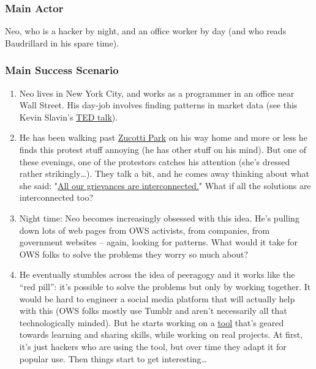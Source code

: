 \subsubsection{Main Actor}

Neo, who is a hacker by night, and an office worker by day (and who
reads Baudrillard in his spare time).

\subsubsection{Main Success Scenario}

\begin{enumerate}
\item
  Neo lives in New York City, and works as a programmer in an office
  near Wall Street. His day-job involves finding patterns in market data
  (see this Kevin Slavin's
  \href{http://www.ted.com/talks/kevin\_slavin\_how\_algorithms\_shape\_our\_world.html}{TED
  talk}).
\item
  He has been walking past
  \href{http://en.wikipedia.org/wiki/Zuccotti\_Park}{Zucotti Park} on
  his way home and more or less he finds this protest stuff annoying (he
  has other stuff on his mind). But one of these evenings, one of the
  protestors catches his attention (she's dressed rather
  strikingly\ldots{}). They talk a bit, and he comes away thinking about
  what she said:
  "\href{http://www.nycga.net/files/2011/11/DeclarationFlowchart\_v2\_large.jpg}{All
  our grievances are interconnected.}" What if all the solutions are
  interconnected too?
\item
  Night time: Neo becomes increasingly obsessed with this idea. He's
  pulling down lots of web pages from OWS activists, from companies,
  from government websites -- again, looking for patterns. What would it
  take for OWS folks to solve the problems they worry so much about?
\item
  He eventually stumbles across the idea of peeragogy and it works like
  the ``red pill'': it's possible to solve the problems but only by
  working together. It would be hard to engineer a social media platform
  that will actually help with this (OWS folks mostly use Tumblr and
  aren't necessarily all that technologically minded). But he starts
  working on a
  \href{http://campus.ftacademy.org/wiki/index.php/Free\_Technology\_Guild}{tool}
  that's geared towards learning and sharing skills, while working on
  real projects. At first, it's just hackers who are using the tool, but
  over time they adapt it for popular use. Then things start to get
  interesting\ldots{}
\end{enumerate}
